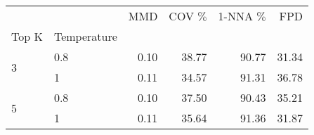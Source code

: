 \begin{tabular}{llrrrr}
  \toprule
                        &             & MMD  & COV \(\%\) & 1-NNA \(\%\) & FPD   \\
  Top K                 & Temperature &      &            &              &       \\
  \midrule
  \multirow[t]{2}{*}{3} & 0.8         & 0.10 & 38.77      & 90.77        & 31.34 \\
  \textbf{}             & 1           & 0.11 & 34.57      & 91.31        & 36.78 \\
  \cline{1-6}
  \multirow[t]{2}{*}{5} & 0.8         & 0.10 & 37.50      & 90.43        & 35.21 \\
  \textbf{}             & 1           & 0.11 & 35.64      & 91.36        & 31.87 \\
  \cline{1-6}
  \bottomrule
\end{tabular}

